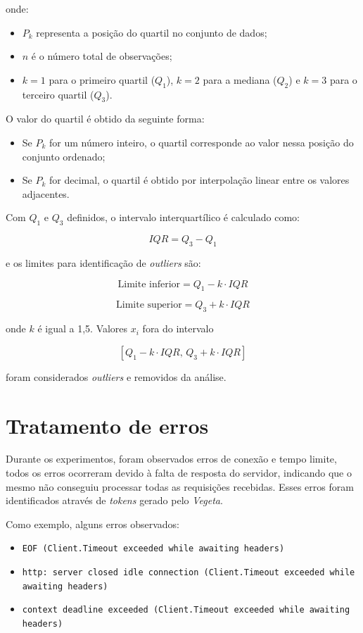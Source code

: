 \documentclass[12pt, openright, oneside, a4paper, english,	french,	spanish, brazil	]{abntex2}
\begin{document}
    onde:
    \begin{itemize}
        \item $P_k$ representa a posição do quartil no conjunto de dados;
        \item $n$ é o número total de observações;
        \item $k = 1$ para o primeiro quartil ($Q_1$), $k = 2$ para a mediana ($Q_2$) e $k = 3$ para o terceiro quartil ($Q_3$).
    \end{itemize}

    O valor do quartil é obtido da seguinte forma:
    \begin{itemize}
        \item Se $P_k$ for um número inteiro, o quartil corresponde ao valor nessa posição do conjunto ordenado;
        \item Se $P_k$ for decimal, o quartil é obtido por interpolação linear entre os valores adjacentes.
    \end{itemize}

    Com $Q_1$ e $Q_3$ definidos, o intervalo interquartílico é calculado como:

    \[
    IQR = Q_3 - Q_1
    \]

    e os limites para identificação de \textit{outliers} são:

    \[
    \text{Limite inferior} = Q_1 - k \cdot IQR
    \]

    \[
    \text{Limite superior} = Q_3 + k \cdot IQR
    \]

    onde $k$ é igual a 1,5. Valores $x_i$ fora do intervalo 

    \[
    [Q_1 - k \cdot IQR, \, Q_3 + k \cdot IQR]
    \]

    foram considerados \textit{outliers} e removidos da análise.

    \section{Tratamento de erros}

    Durante os experimentos, foram observados erros de conexão e tempo limite, todos os erros ocorreram devido à falta de resposta do servidor, indicando que o mesmo não conseguiu processar todas as requisições recebidas. Esses erros foram identificados através de \textit{tokens} gerado pelo \textit{Vegeta}. 

    Como exemplo, alguns erros observados:
    \begin{itemize}
        \item \texttt{EOF (Client.Timeout exceeded while awaiting headers)}
        \item \texttt{http: server closed idle connection (Client.Timeout exceeded while awaiting headers)}
        \item \texttt{context deadline exceeded (Client.Timeout exceeded while awaiting headers)}
    \end{itemize}
\end{document}
